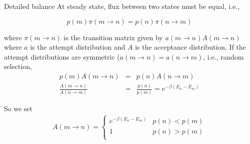 \documentclass[aspectratio=169]{beamer}
\begin{document}
    \begin{frame}{Detailed balance}
        At steady state, flux between two states must be equal, i.e.,

        \begin{equation*}
            p(m) \pi(m \rightarrow n) = p(n) \pi(n \rightarrow m)
        \end{equation*}

        where $\pi(m \rightarrow n)$ is the transition matrix given by $a(m \rightarrow n)A(m \rightarrow n)$ where $a$ is the attempt distribution and $A$ is the acceptance distribution. If the attempt distributions are symmetric ($a(m \rightarrow n) = a(n \rightarrow m)$, i.e., random selection,
        \begin{eqnarray*}
            p(m) A(m \rightarrow n) & = & p(n) A(n \rightarrow m)\\
            \frac{A(m \rightarrow n)}{A(n \rightarrow m)} & = & \frac{p(n)}{p(m)} = e^{-\beta (E_n - E_m)}
        \end{eqnarray*}

        So we set
        \begin{eqnarray*}
            A(m \rightarrow n) = \begin{cases}
                                     e^{-\beta (E_n - E_m)} &p(n) < p(m)\\
                                     1 & p(n) > p(m)\\
            \end{cases}
        \end{eqnarray*}

    \end{frame}
\end{document}
